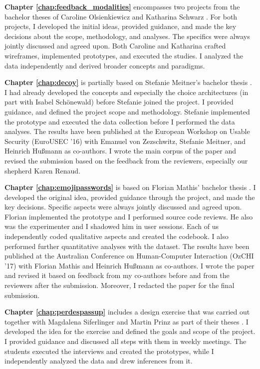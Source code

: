 \textbf{Chapter \ref{chap:feedback_modalities}} encompasses two projects from the bachelor theses of Caroline Olsienkiewicz \cite{Olsienkiewicz2016BAThesis} and Katharina Schwarz \cite{Schwarz2016BAThesis}. For both projects, I developed the initial ideas, provided guidance, and made the key decisions about the scope, methodology, and analyses. The specifics were always jointly discussed and agreed upon. Both Caroline and Katharina crafted wireframes, implemented prototypes, and executed the studies. I analyzed the data independently and derived broader concepts and paradigms. 

\textbf{Chapter \ref{chap:decoy}} is partially based on Stefanie Meitner's bachelor thesis \cite{Meitner2016BADecoy}. I had already developed the concepts and especially the choice architectures (in part with Isabel Schönewald) before Stefanie joined the project. I provided guidance, and defined the project scope and methodology. Stefanie implemented the prototype and executed the data collection before I performed the data analyses. The results have been published at the European Workshop on Usable Security (EuroUSEC '16) with Emanuel von Zezschwitz, Stefanie Meitner, and Heinrich Hußmann as co-authors. I wrote the main corpus of the paper and revised the submission based on the feedback from the reviewers, especially our shepherd Karen Renaud. 

\textbf{Chapter \ref{chap:emojipasswords}} is based on Florian Mathis' bachelor thesis \cite{Mathis2017BA}. I developed the original idea, provided guidance through the project, and made the key decisions. Specific aspects were always jointly discussed and agreed upon. Florian implemented the prototype and I performed source code reviews. He also was the experimenter and I shadowed him in user sessions. Each of us independently coded qualitative aspects and created the codebook. I also performed further quantitative analyses with the dataset. The results have been published at the Australian Conference on Human-Computer Interaction (OzCHI '17) with Florian Mathis and Heinrich Hußmann as co-authors. I wrote the paper and revised it based on feedback from my co-authors before and from the reviewers after the submission. Moreover, I redacted the paper for the final submission. 

\textbf{Chapter \ref{chap:perdespassup}} includes a design exercise that was carried out together with Magdalena Siferlinger and Martin Prinz as part of their theses \cite{Prinz2017Thesis, Siferlinger2017BAThesis}. I developed the idea for the exercise and defined the goals and scope of the project. I provided guidance and discussed all steps with them in weekly meetings. The students executed the interviews and created the prototypes, while I independently analyzed the data and drew inferences from it.